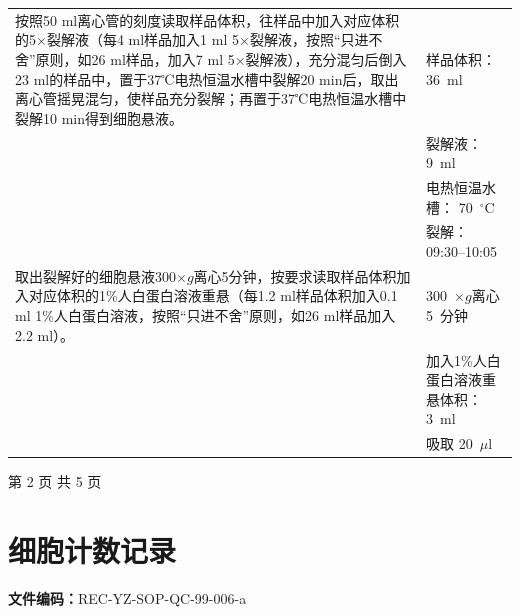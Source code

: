 \documentclass[UTF8,10pt,a4paper,fontset=fandol]{ctexart}
\newcommand{\fieldvalue}[1]{#1}
\newcommand{\handwritten}[1]{#1}
\begin{document}
\begin{tabular}{|p{7.2cm}|p{6.1cm}|}
\hline
按照50 ml离心管的刻度读取样品体积，往样品中加入对应体积的5$\times$裂解液（每4 ml样品加入1 ml 5$\times$裂解液，按照“只进不舍”原则，如26 ml样品，加入7 ml 5$\times$裂解液），充分混匀后倒入23 ml的样品中，置于37℃电热恒温水槽中裂解20 min后，取出离心管摇晃混匀，使样品充分裂解；再置于37℃电热恒温水槽中裂解10 min得到细胞悬液。&
样品体积：
\fieldvalue{\handwritten{36}}\ ml\\
&
裂解液：
\fieldvalue{\handwritten{9}}\ ml\\
&
电热恒温水槽：
\fieldvalue{\handwritten{70}}\ \ensuremath{^\circ\mathrm{C}}\\
&
裂解：
\fieldvalue{\handwritten{09:30--10:05}}\\
\hline
取出裂解好的细胞悬液300$\times g$离心5分钟，按要求读取样品体积加入对应体积的1\%人白蛋白溶液重悬（每1.2 ml样品体积加入0.1 ml 1\%人白蛋白溶液，按照“只进不舍”原则，如26 ml样品加入2.2 ml）。&
\fieldvalue{\handwritten{300}}\ $\times g$离心
\fieldvalue{\handwritten{5}}\ 分钟\\
&
加入1\%人白蛋白溶液重悬体积：
\fieldvalue{\handwritten{3}}\ ml\\
&
吸取
\fieldvalue{\handwritten{20}}\ $\mu$l\\
\hline
\end{tabular}

\begin{center}
第 2 页 共 5 页
\end{center}

\newpage

\section*{细胞计数记录}

\noindent
\textbf{文件编码：}REC-YZ-SOP-QC-99-006-a
\end{document}
